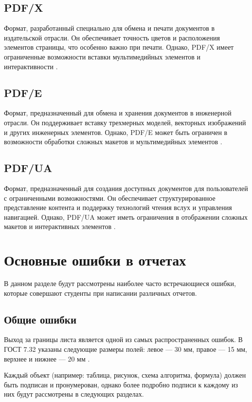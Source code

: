 \subsection{PDF/X}
Формат, разработанный специально для обмена и печати документов в издательской отрасли. Он обеспечивает точность цветов и расположения элементов страницы, что особенно важно при печати. Однако, PDF/X имеет ограниченные возможности вставки мультимедийных элементов и интерактивности \cite{abdobe_PDF}.


\subsection{PDF/E}
Формат, предназначенный для обмена и хранения документов в инженерной отрасли. Он поддерживает вставку трехмерных моделей, векторных изображений и других инженерных элементов. Однако, PDF/E может быть ограничен в возможности обработки сложных макетов и мультимедийных элементов \cite{abdobe_PDF}.
\subsection{PDF/UA}
Формат, предназначенный для создания доступных документов для пользователей с ограниченными возможностями. Он обеспечивает структурированное представление контента и поддержку технологий чтения вслух и управления навигацией. Однако, PDF/UA может иметь ограничения в отображении сложных макетов и интерактивных элементов \cite{abdobe_PDF}.






\section{Основные ошибки в отчетах}
В данном разделе будут рассмотрены наиболее часто встречающиеся ошибки, которые совершают студенты при написании различных отчетов.

\subsection{Общие ошибки}
Выход за границы листа является одной из самых распространенных ошибок. В ГОСТ 7.32 указаны следующие размеры полей: левое — 30 мм, правое — 15 мм, верхнее и нижнее — 20 мм \cite{GOST732}. 

Каждый объект (например: таблица, рисунок, схема алгоритма, формула) должен быть подписан и пронумерован, однако более подробно подписи к каждому из них будут рассмотрены в следующих разделах.


